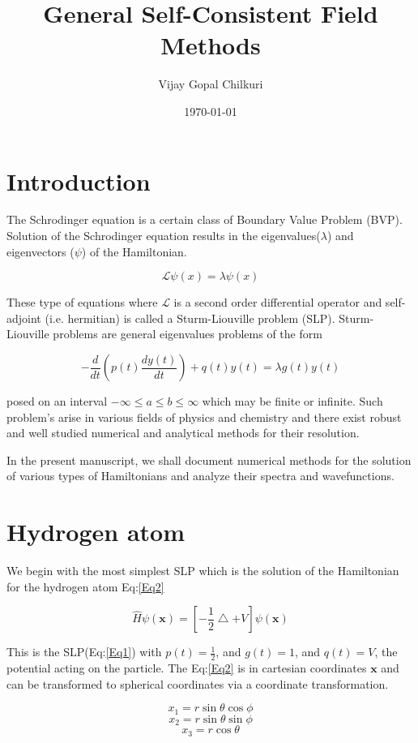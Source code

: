 \documentclass[11pt,a4paper]{article}
\author{Vijay Gopal Chilkuri}
\date{\today}
\title{General Self-Consistent Field Methods}
\begin{document}
\maketitle
\tableofcontents


\section{Introduction}
\label{sec:org3096347}

The Schrodinger equation is a certain class of Boundary Value Problem (BVP).
Solution of the Schrodinger equation results in the eigenvalues(\(\lambda\)) and
eigenvectors (\(\psi\)) of the Hamiltonian.

\[
\mathcal{L}\psi(x) = \lambda\psi(x)
\]

These type of equations where \(\mathcal{L}\) is a second order differential
operator and self-adjoint (i.e. hermitian) is called a Sturm-Liouville problem (SLP).
Sturm-Liouville problems are general eigenvalues problems of the form

\[
-\frac{d}{dt}\left ( p(t) \frac{d y(t)}{dt} \right ) + q(t)y(t) = \lambda g(t)y(t)
\]

posed on an interval \(-\infty \le a \le b \le \infty\) which may be finite or infinite. Such
problem's arise in various fields of physics and chemistry and there exist
robust and well studied numerical and analytical methods for their resolution.

In the present manuscript, we shall document numerical methods for the solution
of various types of Hamiltonians and analyze their spectra and wavefunctions.

\section{Hydrogen atom}
\label{sec:org8e6d43b}
We begin with the most simplest SLP which is the solution
of the Hamiltonian for the hydrogen atom Eq:\ref{Eq2}

\[
\hat{H}\psi(\mathbf{x}) = \left [ -\frac{1}{2}\bigtriangleup + V \right ]\psi(\mathbf{x})
\]

This is the SLP(Eq:\ref{Eq1}) with \(p(t)=\frac{1}{2}\), and \(g(t)=1\), and \(q(t)=V\), the potential acting
on the particle. The Eq:\ref{Eq2} is in cartesian coordinates \(\mathbf{x}\) and
can be transformed to spherical coordinates via a coordinate transformation.

\[
x_1 = r\sin{\theta}\cos{\phi}
\]
\[
x_2 = r\sin{\theta}\sin{\phi}
\]
\[
x_3 = r\cos{\theta}
\]
\end{document}
